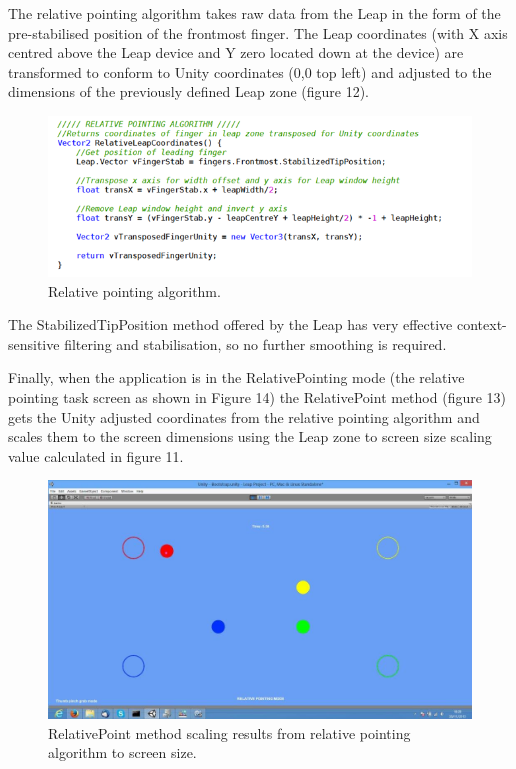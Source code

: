 \documentclass{article}
\begin{document}
The relative pointing algorithm takes raw data from the Leap in the form of the pre-stabilised position of the frontmost finger. The Leap coordinates (with X axis centred above the Leap device and Y zero located down at the device) are transformed to conform to Unity coordinates (0,0 top left) and adjusted to the dimensions of the previously defined Leap zone (figure 12).

\begin{figure}[!h]
    \centering
    \includegraphics[width=7.0in]{Figure_11}
    \caption{Relative pointing algorithm.}
\end{figure}
 
The StabilizedTipPosition method offered by the Leap has very effective context-sensitive filtering and stabilisation, so no further smoothing is required.

Finally, when the application is in the RelativePointing mode (the relative pointing task screen as shown in Figure 14) the RelativePoint method (figure 13) gets the Unity adjusted coordinates from the  relative pointing algorithm and scales them to the screen dimensions using the Leap zone to screen size scaling value calculated in figure 11.

\begin{figure}[!h]
    \centering
    \includegraphics[width=7.0in]{Figure_13}
    \caption{RelativePoint method scaling results from relative pointing algorithm to screen size.}
\end{figure}
\end{document}
